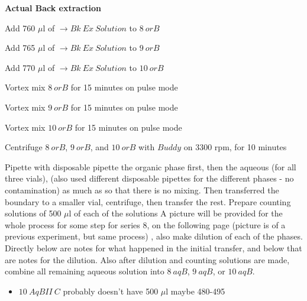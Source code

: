 \documentclass[idxtotoc,hyperref,openany,oneside]{labbook} %
\newcommand{\cmark}{\ding{51}}%
\newcommand{\done}{\rlap{$\square$}{\raisebox{2pt}{\large\hspace{1pt}\cmark}}%
  \hspace{-2.5pt}}
\begin{document}
\textbf{Actual Back extraction}

\begin{todolist}
\item[\done]{Add 760 $\mu$l of $\boxed{\rightarrow Bk\ Ex\ Solution}$
  to $\boxed{8\ orB}$}
\item[\done]{Add 765 $\mu$l of $\boxed{\rightarrow Bk\ Ex\ Solution}$
  to $\boxed{9\ orB}$}
\item[\done]{Add 770 $\mu$l of $\boxed{\rightarrow Bk\ Ex\ Solution}$
  to $\boxed{10\ orB}$}
\item[\done]{Vortex mix $\boxed{8\ orB}$
  for 15 minutes on pulse mode}
\item[\done]{Vortex mix $\boxed{9\ orB}$ for 15 minutes on pulse mode}
\item[\done]{Vortex mix $\boxed{10\ orB}$ for 15 minutes on pulse mode}

\item[\done]{Centrifuge $\boxed{8\ orB}$, $\boxed{9\ orB}$,
  and $\boxed{10\ orB}$
  with $\boxed{Buddy}$ on 3300 rpm, for 10 minutes}

\item[\done]{Pipette with disposable pipette the organic phase
  first, then the aqueous (for all three vials),
  (also used different disposable pipettes for the
  different phases - no contamination)
  as much as so that there is no mixing.
  Then transferred the boundary to a smaller vial,
  centrifuge, then transfer the rest.
  Prepare counting solutions of 500 $\mu$l of each of the solutions
  A picture will be provided for the whole process for
  some step for series 8,
  on the following page (picture is of a previous experiment,
  but same process)
  , also make dilution of each of the phases. Directly below
  are notes for what happened in the initial transfer,
  and below that are notes for the dilution. Also after
  dilution and counting solutions are made, combine all remaining
  aqueous solution into $\boxed{8\ aqB}$, $\boxed{9\ aqB}$,
  or $\boxed{10\ aqB}$. }
  \begin{itemize}
  \item{$\boxed{10\ AqBII\ C}$ probably doesn't have 500 $\mu$l
  maybe 480-495}
  \end{itemize}
  

\end{todolist}
\end{document}
